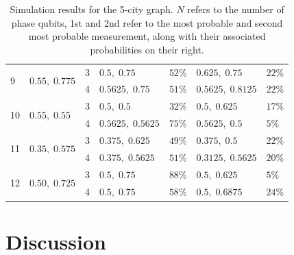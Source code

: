 \documentclass[msc,oneside]{ubcthesis}
\begin{document}
\begin{table}[ht!]
\begin{tabular}{lllllll}
			\hline
			\multirow{2}{*}{9} & \multirow{2}{*}{$0.55, \; 0.775$} & 3 & $0.5, \; 0.75$ & $52\%$ &  $0.625, \; 0.75$  & $22\%$ \\
			&                          & 4& $0.5625, \; 0.75$ & $51\%$ &  $0.5625, \; 0.8125$  & $22\%$ \\
			\hline
			\multirow{2}{*}{10} & \multirow{2}{*}{$0.55, \; 0.55$ } & 3 & $0.5, \; 0.5$ & $32\%$ &  $0.5, \; 0.625$  & $17\%$ \\
			&                          & 4& $0.5625, \; 0.5625$ & $75\%$ &  $0.5625, \; 0.5$  & $5\%$ \\
			\hline
			\multirow{2}{*}{11} & \multirow{2}{*}{$0.35, \; 0.575$} & 3 & $0.375, \; 0.625$ & $49\%$ &  $0.375, \; 0.5$  & $22\%$ \\
			&                          & 4& $0.375, \; 0.5625$ & $51\%$ &  $0.3125, \; 0.5625$  & $20\%$ \\
			\hline
			\multirow{2}{*}{12} & \multirow{2}{*}{$0.50, \; 0.725$ } & 3 & $0.5, \; 0.75$ & $88\%$ &  $0.5, \; 0.625$  & $5\%$ \\
			&                          & 4& $0.5, \; 0.75$ & $58\%$ &  $0.5, \; 0.6875$  & $24\%$ \\
			
			\bottomrule
		\end{tabular}
		\caption{Simulation results for the 5-city graph. $N$ refers to the number of phase qubits, 1st and 2nd refer to the most probable and second most probable measurement, along with their associated probabilities on their right.}
		\label{table:sim-results-5-city}
	\end{table} 
	
	
	
	
	
	\chapter{Discussion}
	
	
\end{document}
